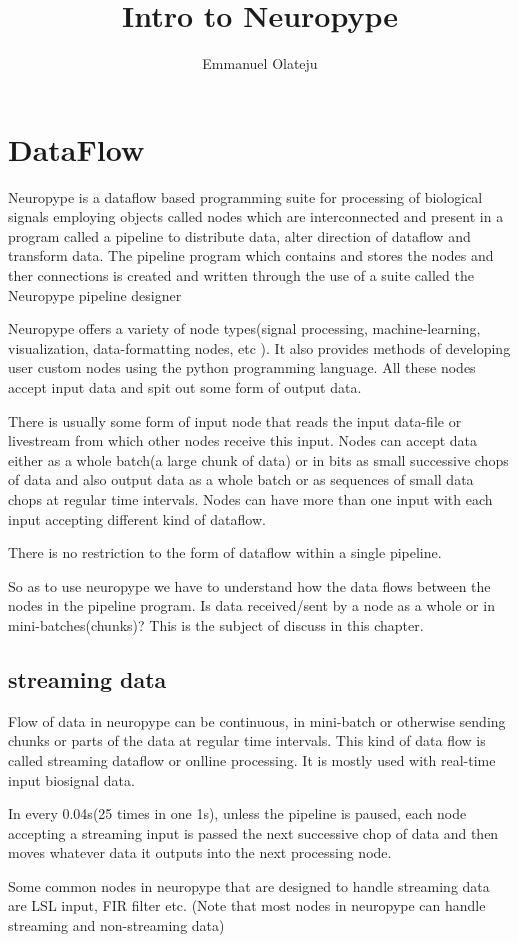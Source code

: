 \documentclass[16pt]{book}
\begin{document}
\title{Intro to Neuropype}
\author{Emmanuel Olateju}
\maketitle

\tableofcontents
\chapter{DataFlow}
\par\noindent Neuropype is a dataflow based programming suite for processing of biological signals employing
objects called nodes which are interconnected and present in a program called a pipeline to distribute data,
alter direction of dataflow and transform data.
The pipeline program which contains and stores the nodes and ther connections is created and written through the use of a
 suite called the Neuropype pipeline designer
\par\noindent Neuropype offers a variety of node types(signal processing, machine-learning, visualization, data-formatting
 nodes, etc ).
It also provides methods of developing user custom nodes using the python programming language. All these nodes accept 
input data and spit out some form of output data.
\par\noindent There is usually some form of input node that reads the input data-file or livestream from which other 
nodes receive this input. Nodes can accept data either as a whole batch(a large chunk of data) or in bits as small 
successive chops of data and also output data as a whole batch or as sequences of small data chops at regular time 
intervals. Nodes can have more than one input with each input accepting different kind of dataflow.
\par\noindent There is no restriction to the form of dataflow within a single pipeline.
\par\noindent So as to use neuropype we have to understand how the data flows between the nodes in the pipeline program. 
Is data received/sent by a node as a whole or in mini-batches(chunks)?
This is the subject of discuss in this chapter.
\section{streaming data}
\par\noindent Flow of data in neuropype can be continuous, in mini-batch or otherwise sending chunks or parts of the data 
at regular time intervals. This kind of data flow is called streaming dataflow or onlline processing. It is mostly used
 with real-time input biosignal data.
\par\indent In every 0.04s(25 times in one 1s), unless the pipeline is paused, each node accepting a streaming input is 
passed the next successive chop of data and then moves whatever data it outputs into the next processing node.
\par\noindent Some common nodes in neuropype that are designed to handle streaming data are LSL input, FIR filter etc.
(Note that most nodes in neuropype can handle streaming and non-streaming data)
\end{document}
